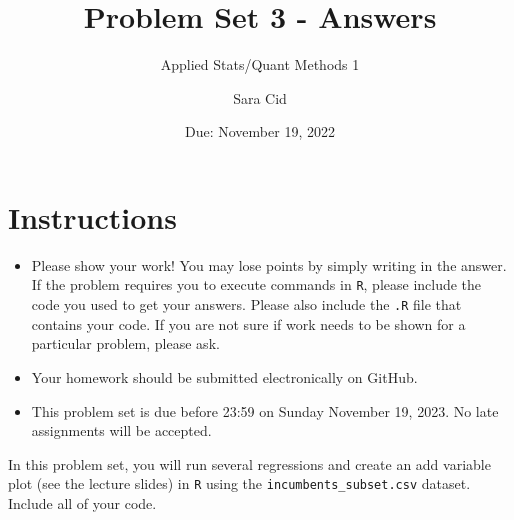 \documentclass[12pt,letterpaper]{article}
\title{Problem Set 3 - Answers}
\date{Due: November 19, 2022}
\author{Applied Stats/Quant Methods 1}
\author{Sara Cid}
\begin{document}
	\maketitle
	\section*{Instructions}
	\begin{itemize}
		\item Please show your work! You may lose points by simply writing in the answer. If the problem requires you to execute commands in \texttt{R}, please include the code you used to get your answers. Please also include the \texttt{.R} file that contains your code. If you are not sure if work needs to be shown for a particular problem, please ask.
	\item Your homework should be submitted electronically on GitHub.
	\item This problem set is due before 23:59 on Sunday November 19, 2023. No late assignments will be accepted.

	\end{itemize}

		\vspace{.25cm}
	
\noindent In this problem set, you will run several regressions and create an add variable plot (see the lecture slides) in \texttt{R} using the \texttt{incumbents\_subset.csv} dataset. Include all of your code.

\newpage

	\vspace{.5cm}
\end{document}

